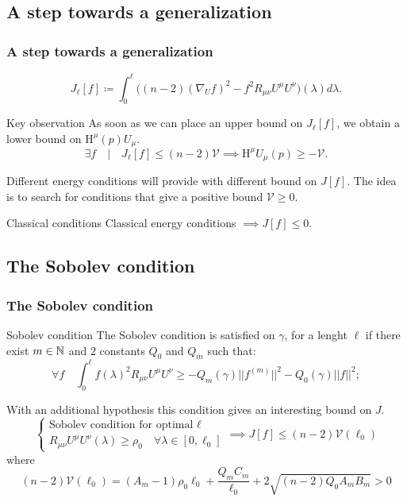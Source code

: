 \documentclass[handout]{beamer}
\begin{document}
	\subsection{A step towards a generalization}
	\begin{frame}
		\frametitle{A step towards a generalization}
		\[
		J_{\ell}[f] \coloneqq \int_{0}^{\ell} \big((n -2)(\nabla_Uf)^2 - f^2R_{\mu\nu}U^{\mu}U^{\nu} \big)(\lambda) d\lambda.
		\]
		\begin{ideablock}{Key observation}
			As soon as we can place an upper bound on \(J_{\ell}[f]\), we obtain a lower bound on \(\mathrm{H}^{\mu}(p)U_{\mu}\).
			\[
				\exists f \quad\vert\quad  J_{\ell}[f] \le (n - 2)\mathcal{V} \implies \mathrm{H}^{\mu}U_{\mu}(p) \ge -\mathcal{V}.
			\]
		\end{ideablock}
		Different energy conditions will provide with different bound on \(J[f]\). The idea is to search for conditions that give a positive bound \(\mathcal{V} \ge 0\).
		\begin{defblock}{Classical conditions}
			Classical energy conditions \(\implies J[f] \le 0\). 
		\end{defblock}

	\end{frame}

	\subsection{The Sobolev condition}
	\begin{frame}
		\frametitle{The Sobolev condition}
		\begin{defblock}{Sobolev condition}
		The Sobolev condition is satisfied on \(\gamma\), for a lenght \(\ell\) if there exist \(m\in{\mathbb{N}}\) and \(2\) constants \(Q_0\) and \(Q_m\) such that:
		\[
		\forall f \quad
		\int_0^{\ell} f(\lambda)^2 R_{\mu\nu}U^{\mu}U^{\nu} \ge -Q_m(\gamma) \vert\vert f^{(m)}\vert\vert^2 - Q_0(\gamma) \vert\vert f\vert\vert^2;
		\]
		\end{defblock}
		With an additional hypothesis this condition gives an interesting bound on \(J\).
		\[
		\begin{cases}
			\text{Sobolev condition for optimal }\ell \\
			R_{\mu\nu}U^{\mu}U^{\nu}(\lambda) \ge \rho_0 \quad \forall\lambda\in[0,\ell_0]
		\end{cases}	
		\implies
		J[f] \le (n - 2)\mathcal{V}(\ell_0)
		\]
		where
		\[
			(n - 2)\mathcal{V}(\ell_0) = (A_m - 1)\rho_0\ell_0 + \frac{Q_mC_m}{\ell_0} + 2\sqrt{(n - 2)Q_0A_mB_m} > 0
		\]
	\end{frame}
\end{document}
